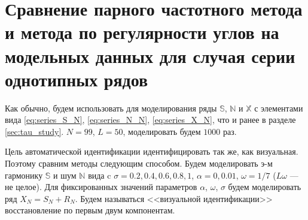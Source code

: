 \documentclass[specialist,
               substylefile = spbu.rtx,
               subf,href,colorlinks=true, 12pt]{disser}
\begin{document}
%
%
%
%

\section{Сравнение парного частотного метода и метода по регулярности углов на модельных данных для случая серии однотипных рядов}
\label{sec:comp_tau1_pgram_many_same_series}
Как обычно, будем использовать для моделирования ряды $\mathbb{S}$, $\mathbb{N}$ и $\mathbb{X}$ с элементами вида
\eqref{eq:series_S_N}, \eqref{eq:series_N_N}, \eqref{eq:series_X_N}, что и ранее в разделе \ref{sec:tau_study}.
$N = 99$, $L = 50$, моделировать будем $1000$ раз.

Цель автоматической идентификации идентифицировать так же, как визуальная.
Поэтому сравним методы следующим способом.
Будем моделировать э-м гармонику $\mathbb{S}$ и шум $\mathbb{N}$ вида
c $\sigma = 0.2, 0.4, 0.6, 0.8, 1$, $\alpha = 0, 0.01$, $\omega = 1/7$ ($L\omega$ --- не целое).
Для фиксированных значений параметров $\alpha$, $\omega$, $\sigma$ будем моделировать ряд $X_N = S_N + R_N$. Будем называться <<визуальной идентификации>> восстановление по первым двум компонентам.
\end{document}
